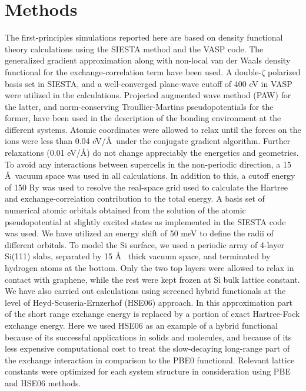 \documentclass[journal=nalefd]{achemso}
\begin{document}
\section{Methods}
The first-principles simulations reported here are based on density functional theory calculations 
using the  {\sc SIESTA} method\cite{soler02}  and the {\sc VASP} code\cite{kresse93,kresse96}. 
The generalized gradient approximation\cite{pbe-functional} along with 
non-local van der Waals density functional for the exchange-correlation term\cite{Dion-vdW}
have been used. A double-$\zeta$ polarized basis set in {\sc SIESTA}, and a well-converged plane-wave 
cutoff of 400 eV in {\sc VASP} were utilized in the calculations. Projected augmented wave 
method (PAW)\cite{Blochl94,kresse99} for the latter, 
and norm-conserving Troullier-Martins pseudopotentials\cite{troullier91} for the former, 
have been used in the description of the bonding environment at the different systems. 
Atomic coordinates were allowed to relax until the forces on the ions 
were less than 0.04 eV/\AA~under the conjugate gradient algorithm. 
Further relaxations (0.01 eV/\AA) do not change appreciably the energetics and geometries. 
To avoid any interactions between supercells in the non-periodic direction, a 15 \AA~vacuum space was 
used in all calculations. In addition to this, a cutoff energy of 150 Ry was used to resolve 
the real-space grid used to calculate the Hartree and exchange-correlation contribution to the total energy. 
A basis set of numerical atomic orbitals obtained 
from the solution of the atomic pseudopotential at slightly excited states 
as implemented in the {\sc SIESTA}\cite{soler02} code was used. We have utilized an 
energy shift of 50 meV to define the radii of different orbitals. 
To model the Si surface, we used a periodic array of 4-layer Si(111) slabs, separated by 15 \AA~ 
thick vacuum space, and terminated by hydrogen atoms at the bottom. 
Only the two top layers were allowed to relax in contact with graphene, 
while the rest were kept frozen at Si bulk lattice constant. 
We have also carried out calculations using screened hybrid functionals at the level of 
Heyd-Scuseria-Ernzerhof (HSE06) approach\cite{HSE06}. In this approximation 
part of the short range exchange energy is replaced by a portion 
of exact Hartree-Fock exchange energy. 
Here we used HSE06 as an example 
of a hybrid functional because of its 
successful applications in solids and molecules\cite{Kresse06,Kresse07,Franchini07}, 
and because of its less expensive computational cost to treat the slow-decaying long-range part of 
the exchange interaction in comparison to the  
PBE0 functional\cite{HSE-paper03}.
Relevant lattice constants were optimized for each system structure in consideration using PBE and HSE06 methods.
\end{document}
